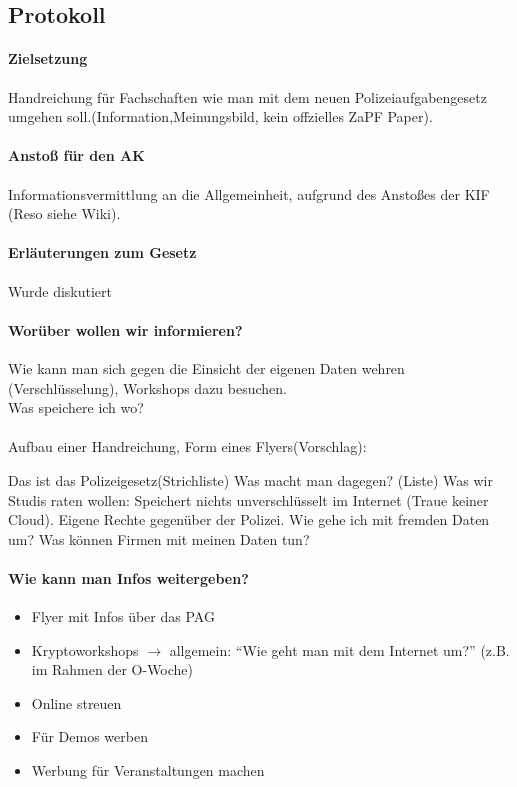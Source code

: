   \subsection*{Protokoll}
    \paragraph{Zielsetzung}
      Handreichung für Fachschaften wie man mit dem neuen Polizeiaufgabengesetz umgehen soll.(Information,Meinungsbild, kein offzielles ZaPF Paper).

    \paragraph{Anstoß für den AK}
      Informationsvermittlung an die Allgemeinheit, aufgrund des Anstoßes der KIF (Reso siehe Wiki).

    \paragraph{Erläuterungen zum Gesetz}
      Wurde diskutiert

    \paragraph{Worüber wollen wir informieren?}
      Wie kann man sich gegen die Einsicht der eigenen Daten wehren (Verschlüsselung), Workshops dazu besuchen. \\
      Was speichere ich wo? \\ \\

      Aufbau einer Handreichung, Form eines Flyers(Vorschlag):
      \begin{outline}
        \1 Das ist das Polizeigesetz(Strichliste)
        \1 Was macht man dagegen? (Liste)
        \1 Was wir Studis raten wollen:
          \2 Speichert nichts unverschlüsselt im Internet (Traue keiner Cloud).
          \2 Eigene Rechte gegenüber der Polizei.
          \2 Wie gehe ich mit fremden Daten um?
          \2 Was können Firmen mit meinen Daten tun?
      \end{outline}

    \paragraph{Wie kann man Infos weitergeben?}
      \begin{itemize}
        \item Flyer mit Infos über das PAG
        \item Kryptoworkshops $\rightarrow$ allgemein: ``Wie geht man mit dem Internet um?''  (z.B. im Rahmen der O-Woche)
        \item Online streuen
        \item Für Demos werben
        \item Werbung für Veranstaltungen machen
      \end{itemize}
